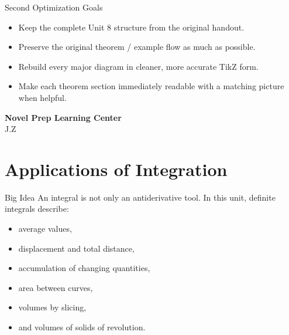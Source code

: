 \documentclass[11pt]{article}
\begin{document}
\begin{titlepage}

\vfill

\begin{minipage}{0.84\textwidth}
\begin{notebox}{Second Optimization Goals}
\begin{itemize}
    \item Keep the complete Unit 8 structure from the original handout.
    \item Preserve the original theorem / example flow as much as possible.
    \item Rebuild every major diagram in cleaner, more accurate TikZ form.
    \item Make each theorem section immediately readable with a matching picture when helpful.
\end{itemize}
\end{notebox}
\end{minipage}

\vfill

{\large\textbf{Novel Prep Learning Center}}\\[0.25em]
{\large J.Z}

\end{titlepage}

\tableofcontents
\newpage

\setcounter{section}{7}
\section{Applications of Integration}

\begin{theorybox}{Big Idea}
An integral is not only an antiderivative tool. In this unit, definite integrals describe:
\begin{itemize}
    \item average values,
    \item displacement and total distance,
    \item accumulation of changing quantities,
    \item area between curves,
    \item volumes by slicing,
    \item and volumes of solids of revolution.
\end{itemize}
\end{theorybox}
\end{document}
